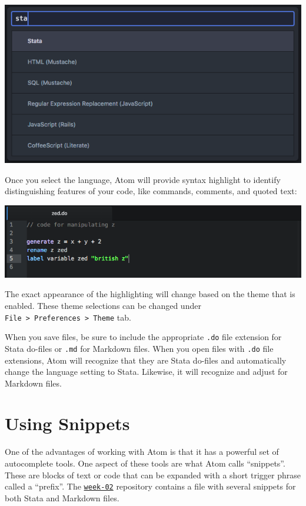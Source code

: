 \documentclass[]{book}
\theoremstyle{definition}
\theoremstyle{definition}
\theoremstyle{remark}
\begin{document}
\includegraphics[width=0.75\linewidth]{images/atomLangSelector}

Once you select the language, Atom will provide syntax highlight to
identify distinguishing features of your code, like commands, comments,
and quoted text:

\includegraphics[width=1\linewidth]{images/atomHighlight}

The exact appearance of the highlighting will change based on the theme
that is enabled. These theme selections can be changed under
\texttt{File\ \textgreater{}\ Preferences\ \textgreater{}\ Theme} tab.

When you save files, be sure to include the appropriate \texttt{.do}
file extension for Stata do-files or \texttt{.md} for Markdown files.
When you open files with \texttt{.do} file extensions, Atom will
recognize that they are Stata do-files and automatically change the
language setting to Stata. Likewise, it will recognize and adjust for
Markdown files.

\section{Using Snippets}\label{using-snippets}

One of the advantages of working with Atom is that it has a powerful set
of autocomplete tools. One aspect of these tools are what Atom calls
``snippets''. These are blocks of text or code that can be expanded with
a short trigger phrase called a ``prefix''. The
\href{https://github.com/slu-soc5650/week-02}{\texttt{week-02}}
repository contains a file with several snippets for both Stata and
Markdown files.
\end{document}
